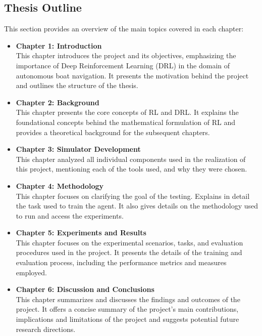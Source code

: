 
\subsection{Thesis Outline}

This section provides an overview of the main topics covered in each chapter:

\begin{itemize}

\item {\bf Chapter 1: Introduction}\\
This chapter introduces the project and its objectives, emphasizing the importance of Deep Reinforcement Learning (DRL) in the domain of autonomous boat navigation. It presents the motivation behind the project and outlines the structure of the thesis.

\item {\bf Chapter 2: Background}\\
This chapter presents the core concepts of RL and DRL. It explains the foundational concepts behind the mathematical formulation of RL and provides a theoretical background for the subsequent chapters.

\item {\bf Chapter 3: Simulator Development}\\
This chapter analyzed all individual components used in the realization of this project, mentioning each of the tools used, and why they were chosen.

\item {\bf Chapter 4: Methodology}\\
This chapter focuses on clarifying the goal of the testing. Explains in detail the task used to train the agent. It also gives details on the methodology used to run and access the experiments.

\item {\bf Chapter 5: Experiments and Results}\\
This chapter focuses on the experimental scenarios, tasks, and evaluation procedures used in the project. It presents the details of the training and evaluation process, including the performance metrics and measures employed. 

\item {\bf Chapter 6: Discussion and Conclusions}\\
This chapter summarizes and discusses the findings and outcomes of the project. It offers a concise summary of the project's main contributions, implications and limitations of the project and suggests potential future research directions. 

\end{itemize}

